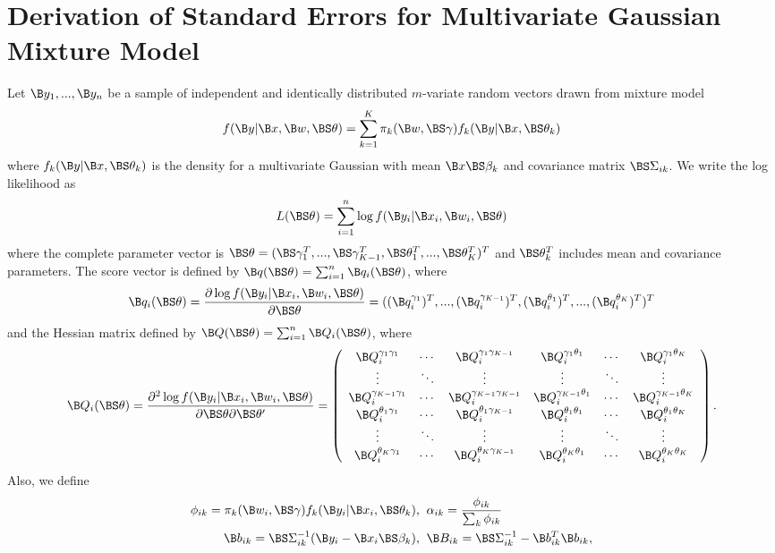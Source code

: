 \chapter{Derivation of Standard Errors for Multivariate Gaussian Mixture Model}\label{append:1}

Let $\B y_{1},...,\B y_{n}$ be a sample of independent and identically distributed  $m$-variate random vectors drawn from mixture model
$$f(\B y|\B x, \B w, \BS\theta) = \sum^{K}_{k=1}\pi_{k}(\B w, \BS\gamma)f_{k}(\B y|\B x, \BS \theta_{k})$$
where $f_{k}(\B y|\B x, \BS \theta_{k})$ is the density for a multivariate Gaussian with mean $\B x\BS\beta_{k}$ and covariance matrix $\BS\Sigma_{ik}$. We write the log likelihood as
$$L(\BS\theta)=\sum^{n}_{i=1}\log f(\B y_{i}|\B x_{i},\B w_{i},\BS\theta)$$
where the complete parameter vector is $\BS\theta=(\BS\gamma_{1}^{T},...,\BS\gamma_{K-1}^{T},\BS\theta^{T}_{1},...,\BS\theta^{T}_{K})^{T}$ and $\BS\theta_{k}^{T}$ includes mean and covariance parameters. The score vector is defined by $\B q(\BS\theta)=\sum_{i=1}^{n}\B q_{i}(\BS \theta)$, where
$$\B q_{i}(\BS\theta)=\frac{\partial \log f(\B y_{i}|\B x_{i},\B w_{i},\BS\theta)}{\partial \BS\theta}=((\B q^{\gamma_{1}}_{i})^{T},...,(\B q^{\gamma_{K-1}}_{i})^{T},(\B q^{\theta_{1}}_{i})^{T},...,(\B q^{\theta_{K}}_{i})^{T})^{T}$$
and the Hessian matrix defined by $\B Q(\BS\theta)=\sum_{i=1}^{n}\B Q_{i}(\BS\theta)$, where
$$ \B Q_{i}(\BS\theta)=\frac{\partial^{2} \log f(\B y_{i}|\B x_{i},\B w_{i},\BS\theta)}{\partial \BS\theta\partial \BS\theta'}=\left(\begin{array}{cccccc} \B Q^{\gamma_{1}\gamma_{1}}_{i}&\cdots&\B Q^{\gamma_{1}\gamma_{K-1}}_{i}&\B Q^{\gamma_{1}\theta_{1}}_{i}&\cdots&\B Q^{\gamma_{1}\theta_{K}}_{i}\\
\vdots&\ddots&\vdots&\vdots&\ddots&\vdots\\
\B Q^{\gamma_{K-1}\gamma_{1}}_{i}&\cdots&\B Q^{\gamma_{K-1}\gamma_{K-1}}_{i}&\B Q^{\gamma_{K-1}\theta_{1}}_{i}&\cdots&\B Q^{\gamma_{K-1}\theta_{K}}_{i}\\
\B Q^{\theta_{1}\gamma_{1}}_{i}&\cdots&\B Q^{\theta_{1}\gamma_{K-1}}_{i}&\B Q^{\theta_{1}\theta_{1}}_{i}&\cdots&\B Q^{\theta_{1}\theta_{K}}_{i}\\
\vdots&\ddots&\vdots&\vdots&\ddots&\vdots\\
\B Q^{\theta_{K}\gamma_{1}}_{i}&\cdots&\B Q^{\theta_{K}\gamma_{K-1}}_{i}&\B Q^{\theta_{K}\theta_{1}}_{i}&\cdots&\B Q^{\theta_{K}\theta_{K}}_{i}\\
\end{array} \right).$$
Also, we define
\begin{align}
\phi_{ik}=\pi_{k}(\B w_{i},\BS\gamma)f_{k}(\B y_{i}|\B x_{i},\BS\theta_{k}),&\;\; \alpha_{ik}=\frac{\phi_{ik}}{\sum_{k}\phi_{ik}}\label{phi}\\
\B b_{ik}=\BS\Sigma_{ik}^{-1}(\B y_{i}-\B x_{i}\BS\beta_{k}),&\;\; \B B_{ik}=\BS\Sigma_{ik}^{-1}-\B b^{T}_{ik}\B b_{ik},\label{bs2}
\end{align}

